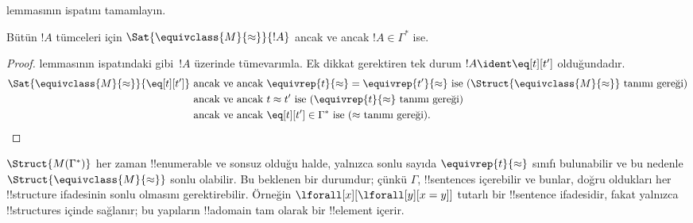 \documentclass[../../../include/open-logic-section]{subfiles}
\begin{document}
\begin{prob}
 lemmasının
ispatını tamamlayın.
\end{prob}

\begin{lem}
Bütün $!A$ tümceleri için $\Sat{\equivclass{M}{\approx}}{!A}$ ancak ve
ancak $!A\in\Gamma^*$ ise.
\end{lem}

\begin{proof}
 lemmasının ispatındaki gibi~$!A$ üzerinde
tümevarımla. Ek dikkat gerektiren tek durum $!A\ident\eq[t][t']$
olduğundadır.
\begin{align*}
\Sat{\equivclass{M}{\approx}}{\eq[t][t']} & \text{ ancak ve ancak }
\equivrep{t}{\approx}=\equivrep{t'}{\approx}
\text{ ise ($\Struct{\equivclass{M}{\approx}}$ tanımı gereği)}\\
& \text{ ancak ve ancak } t\approx t'
\text{ ise ($\equivrep{t}{\approx}$ tanımı gereği)}\\
& \text{ ancak ve ancak } \eq[t][t']\in\Gamma^*
\text{ ise ($\approx$ tanımı gereği).}
\end{align*}
\end{proof}

\begin{digress}
$\Struct{M(\Gamma^*)}$ her zaman !!{enumerable} ve sonsuz olduğu halde,
yalnızca sonlu sayıda $\equivrep{t}{\approx}$ sınıfı bulunabilir ve bu
nedenle $\Struct{\equivclass{M}{\approx}}$ sonlu olabilir. Bu beklenen
bir durumdur; çünkü $\Gamma$, !!{sentence}s içerebilir ve bunlar,
doğru oldukları her !!{structure} ifadesinin sonlu olmasını gerektirebilir.
Örneğin $\lforall[x][\lforall[y][x=y]]$ tutarlı bir !!{sentence}
ifadesidir, fakat yalnızca !!{structure}s içinde sağlanır; bu yapıların
!!a{domain} tam olarak bir !!{element} içerir.
\end{digress}
\end{document}
